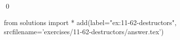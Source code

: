 
\begin{ex}
  \label{ex:11-62-destructors}
  
  \qed
\end{ex}
\begin{python0}
from solutions import *
add(label="ex:11-62-destructors",
    srcfilename='exercises/11-62-destructors/answer.tex')
\end{python0}
